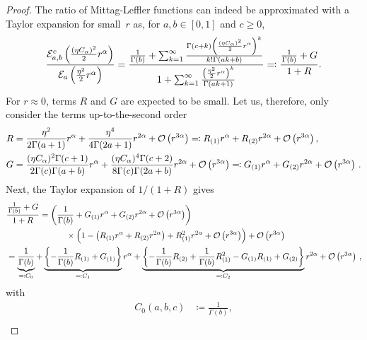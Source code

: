 \begin{proof}
The ratio of Mittag-Leffler functions can indeed be approximated with a Taylor expansion for small~$r$ as, for $a, b \in [0,1]$ and $c \geq 0$,
\[
\frac{\mathcal{E}_{a, b}^{c} \left(\frac{(\eta C_{\alpha})^2}2 r^\alpha\right)}{\mathcal{E}_a\left(\frac{\eta^2}2 r^\alpha\right)} = \frac{\frac{1}{\Gamma(b)} + \sum^{\infty}_{k=1}\frac{\Gamma(c+k) \left(\frac{(\eta C_{\alpha})^2}2 r^\alpha\right)^k}{k!\Gamma(ak+b)}}{1 + \sum^{\infty}_{k=1}\frac{\left(\frac{\eta^2}2 r^\alpha\right)^k}{\Gamma(ak+1)}} \eqqcolon \frac{\frac{1}{\Gamma(b)} + G}{1 + R}. 
\]
For $r \approx 0$, terms $R$ and $G$ are expected to be small. Let us, therefore, only consider the terms up-to-the-second order
\begin{align*}
    R &= \frac{\eta^2}{2\Gamma(a+1)} r^\alpha + \frac{\eta^4}{4\Gamma(2a+1)}r^{2\alpha} + \mathcal{O}\left(r^{3\alpha}\right) \eqqcolon R_{(1)}r^\alpha + R_{(2)}r^{2\alpha} + \mathcal{O}\left(r^{3\alpha}\right), \\
    G &= \frac{(\eta C_{\alpha})^2 \Gamma(c+1)}{2\Gamma(c)\Gamma(a+b)} r^\alpha + \frac{(\eta C_{\alpha})^4 \Gamma(c+2)}{8 \Gamma(c) \Gamma(2a+b)}r^{2\alpha} + \mathcal{O}\left(r^{3\alpha}\right) \eqqcolon G_{(1)}r^\alpha + G_{(2)}r^{2\alpha} + \mathcal{O}\left(r^{3\alpha}\right)\,.
\end{align*}
Next, the Taylor expansion of $1/(1+R)$ gives
{\small
\begin{align*}
    &\frac{\frac{1}{\Gamma(b)} + G}{1 + R} = \left(\frac{1}{\Gamma(b)} + G_{(1)}r^{\alpha} + G_{(2)}r^{2\alpha} + \Oo\left(r^{3\alpha}\right)\right) \\ & \hspace{2.5cm} \times\left(1 - \left(R_{(1)}r^{\alpha} + R_{(2)}r^{2\alpha}\right) + R_{(1)}^2r^{2\alpha} + \Oo\left(r^{3\alpha}\right)\right) + \Oo\left(r^{3\alpha}\right) \\
    &= \underbrace{\frac{1}{\Gamma(b)}}_{\eqqcolon C_0} + \underbrace{\left\{- \frac{1}{\Gamma(b)} R_{(1)} + G_{(1)} \right\}}_{\eqqcolon C_1}r^{\alpha} + \underbrace{\left\{-\frac{1}{\Gamma(b)} R_{(2)} + \frac{1}{\Gamma(b)} R_{(1)}^2 - G_{(1)} R_{(1)} + G_{(2)}\right\}}_{\eqqcolon C_2}r^{2\alpha} + \Oo\left(r^{3\alpha}\right)\,, %
\end{align*}}%
with
{\small
\begin{equation}
\begin{aligned}
    C_0(a,b,c) &\coloneqq \frac{1}{\Gamma(b)}, \\

\end{aligned}
\end{equation}}
\end{proof}
